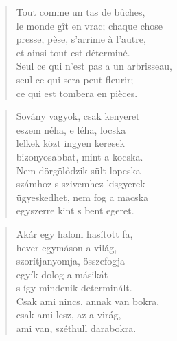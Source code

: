 \bigskip



\begin{verse}
  Tout comme un tas de bûches, \\
  le monde gît en vrac; chaque chose \\
  presse, pèse, s'arrime à l'autre, \\
  et ainsi tout est déterminé. \\
  Seul ce qui n'est pas a un arbrisseau, \\
  seul ce qui sera peut fleurir; \\
  ce qui est tombera en pièces.
\end{verse}

\newpage

\vspace*{-15mm}
\centeredornament



\begin{verse}
  Sovány vagyok, csak kenyeret \\
  eszem néha, e léha, locska \\
  lelkek közt ingyen keresek \\
  bizonyosabbat, mint a kocska. \\
  Nem dörgölődzik sült lopcska \\
  számhoz s szivemhez kisgyerek --- \\
  ügyeskedhet, nem fog a macska \\
  egyszerre kint s bent egeret.
\end{verse}

\bigskip


\begin{verse}
  Akár egy halom hasított fa, \\
  hever egymáson a világ, \\
  szorítjanyomja, összefogja \\
  egyík dolog a másikát \\
  s így mindenik determinált. \\
  Csak ami nincs, annak van bokra, \\
  csak ami lesz, az a virág, \\
  ami van, széthull darabokra.
\end{verse}

